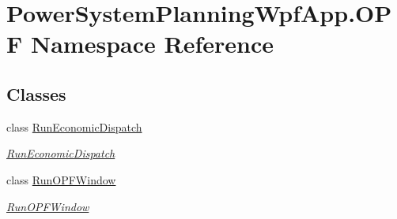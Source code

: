\hypertarget{namespace_power_system_planning_wpf_app_1_1_o_p_f}{}\section{Power\+System\+Planning\+Wpf\+App.\+O\+PF Namespace Reference}
\label{namespace_power_system_planning_wpf_app_1_1_o_p_f}
\subsection*{Classes}
\begin{DoxyCompactItemize}
\item 
class \hyperlink{class_power_system_planning_wpf_app_1_1_o_p_f_1_1_run_economic_dispatch}{Run\+Economic\+Dispatch}
\begin{DoxyCompactList}\small\item\em \hyperlink{class_power_system_planning_wpf_app_1_1_o_p_f_1_1_run_economic_dispatch}{Run\+Economic\+Dispatch} \end{DoxyCompactList}\item 
class \hyperlink{class_power_system_planning_wpf_app_1_1_o_p_f_1_1_run_o_p_f_window}{Run\+O\+P\+F\+Window}
\begin{DoxyCompactList}\small\item\em \hyperlink{class_power_system_planning_wpf_app_1_1_o_p_f_1_1_run_o_p_f_window}{Run\+O\+P\+F\+Window} \end{DoxyCompactList}\end{DoxyCompactItemize}
